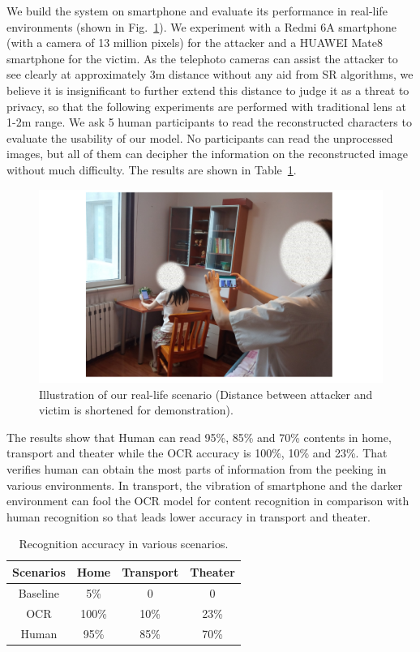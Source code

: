 We build the system on smartphone and evaluate its performance in real-life environments (shown in Fig.~\ref{fig-reallife}). We experiment with a Redmi 6A smartphone (with a camera of 13 million pixels) for the attacker and a HUAWEI Mate8 smartphone for the victim. As the telephoto cameras can assist the attacker to see clearly at approximately 3m distance without any aid from SR algorithms, we believe it is insignificant to further extend this distance to judge it as a threat to privacy, so that the following experiments are performed with traditional lens at 1-2m range. We ask 5 human participants to read the reconstructed characters to evaluate the usability of our model. No participants can read the unprocessed images, but all of them can decipher the information on the reconstructed image without much difficulty. The results are shown in Table~\ref{table-scenarios}.
\begin{figure}
	\centering
	\includegraphics[width=0.80\linewidth]{pic/reallife.pdf}
    \caption{Illustration of our real-life scenario (Distance between attacker and victim is shortened for demonstration).}
	\label{fig-reallife}
\end{figure}

The results show that Human can read 95\%, 85\% and 70\% contents in home, transport and theater while the OCR accuracy is 100\%, 10\% and 23\%. That verifies human can obtain the most parts of information from the peeking in various environments. In transport, the vibration of smartphone and the darker environment can fool the OCR model for content recognition in comparison with human recognition so that leads lower accuracy in transport and theater.

\begin{table}[!t]
    \centering
    \caption{Recognition accuracy in various scenarios.}
    \begin{tabular}{@{}cccc@{}}
        \toprule
    Scenarios & Home & Transport & Theater \\ \midrule
    Baseline & 5\% & 0 & 0\\ 
    \midrule
    OCR & 100\% & 10\% & 23\%\\ 
    Human & 95\% & 85\% & 70\%\\ \bottomrule
    \end{tabular}
    \label{table-scenarios}
\end{table}

